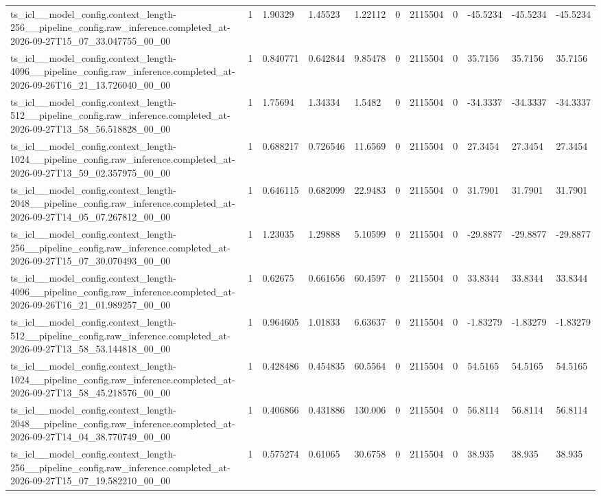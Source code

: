 \begin{tabular}{lllllllllll}
ts\_icl\_\_model\_config.context\_length-256\_\_pipeline\_config.raw\_inference.completed\_at-2026-09-27T15\_07\_33.047755\_00\_00 & 1 & 1.90329 & 1.45523 & 1.22112 & 0 & 2115504 & 0 & -45.5234 & -45.5234 & -45.5234 \\
ts\_icl\_\_model\_config.context\_length-4096\_\_pipeline\_config.raw\_inference.completed\_at-2026-09-26T16\_21\_13.726040\_00\_00 & 1 & 0.840771 & 0.642844 & 9.85478 & 0 & 2115504 & 0 & 35.7156 & 35.7156 & 35.7156 \\
ts\_icl\_\_model\_config.context\_length-512\_\_pipeline\_config.raw\_inference.completed\_at-2026-09-27T13\_58\_56.518828\_00\_00 & 1 & 1.75694 & 1.34334 & 1.5482 & 0 & 2115504 & 0 & -34.3337 & -34.3337 & -34.3337 \\
ts\_icl\_\_model\_config.context\_length-1024\_\_pipeline\_config.raw\_inference.completed\_at-2026-09-27T13\_59\_02.357975\_00\_00 & 1 & 0.688217 & 0.726546 & 11.6569 & 0 & 2115504 & 0 & 27.3454 & 27.3454 & 27.3454 \\
ts\_icl\_\_model\_config.context\_length-2048\_\_pipeline\_config.raw\_inference.completed\_at-2026-09-27T14\_05\_07.267812\_00\_00 & 1 & 0.646115 & 0.682099 & 22.9483 & 0 & 2115504 & 0 & 31.7901 & 31.7901 & 31.7901 \\
ts\_icl\_\_model\_config.context\_length-256\_\_pipeline\_config.raw\_inference.completed\_at-2026-09-27T15\_07\_30.070493\_00\_00 & 1 & 1.23035 & 1.29888 & 5.10599 & 0 & 2115504 & 0 & -29.8877 & -29.8877 & -29.8877 \\
ts\_icl\_\_model\_config.context\_length-4096\_\_pipeline\_config.raw\_inference.completed\_at-2026-09-26T16\_21\_01.989257\_00\_00 & 1 & 0.62675 & 0.661656 & 60.4597 & 0 & 2115504 & 0 & 33.8344 & 33.8344 & 33.8344 \\
ts\_icl\_\_model\_config.context\_length-512\_\_pipeline\_config.raw\_inference.completed\_at-2026-09-27T13\_58\_53.144818\_00\_00 & 1 & 0.964605 & 1.01833 & 6.63637 & 0 & 2115504 & 0 & -1.83279 & -1.83279 & -1.83279 \\
ts\_icl\_\_model\_config.context\_length-1024\_\_pipeline\_config.raw\_inference.completed\_at-2026-09-27T13\_58\_45.218576\_00\_00 & 1 & 0.428486 & 0.454835 & 60.5564 & 0 & 2115504 & 0 & 54.5165 & 54.5165 & 54.5165 \\
ts\_icl\_\_model\_config.context\_length-2048\_\_pipeline\_config.raw\_inference.completed\_at-2026-09-27T14\_04\_38.770749\_00\_00 & 1 & 0.406866 & 0.431886 & 130.006 & 0 & 2115504 & 0 & 56.8114 & 56.8114 & 56.8114 \\
ts\_icl\_\_model\_config.context\_length-256\_\_pipeline\_config.raw\_inference.completed\_at-2026-09-27T15\_07\_19.582210\_00\_00 & 1 & 0.575274 & 0.61065 & 30.6758 & 0 & 2115504 & 0 & 38.935 & 38.935 & 38.935 \\

\end{tabular}

